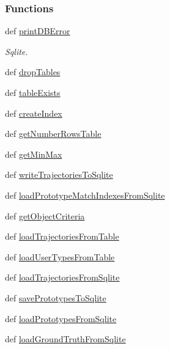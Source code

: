 \subsubsection*{Functions}
\begin{DoxyCompactItemize}
\item 
def \hyperlink{namespacestorage_a04a1c447c91782b0d795707de67ae7b6}{print\-D\-B\-Error}
\begin{DoxyCompactList}\small\item\em Sqlite. \end{DoxyCompactList}\item 
def \hyperlink{namespacestorage_a35c78cf3ce7e197ae90cc8de16a30421}{drop\-Tables}
\item 
def \hyperlink{namespacestorage_aa7fdbbe6654ec5ca55ad0fcf32163f4a}{table\-Exists}
\item 
def \hyperlink{namespacestorage_a850aebaeeaa2d26f74597b82745d5918}{create\-Index}
\item 
def \hyperlink{namespacestorage_acb15e4489aa98d2fd2e32b16bc117757}{get\-Number\-Rows\-Table}
\item 
def \hyperlink{namespacestorage_a96ea45568cc0df3ee1f2c57f0fe4ebaa}{get\-Min\-Max}
\item 
def \hyperlink{namespacestorage_a672b79a876d42080ef53d92a1954ad48}{write\-Trajectories\-To\-Sqlite}
\item 
def \hyperlink{namespacestorage_a4cb2ef5094e697c775c647fd8572ca71}{load\-Prototype\-Match\-Indexes\-From\-Sqlite}
\item 
def \hyperlink{namespacestorage_aabc95387a546365a13eedfaeb9c1cab4}{get\-Object\-Criteria}
\item 
def \hyperlink{namespacestorage_a8df1322946f05da107aae12c3f81ccb3}{load\-Trajectories\-From\-Table}
\item 
def \hyperlink{namespacestorage_ae293f43a618f7cc23940dcc3eae4b86a}{load\-User\-Types\-From\-Table}
\item 
def \hyperlink{namespacestorage_aaafba9f6bc0816ff0084df5e1d892a9d}{load\-Trajectories\-From\-Sqlite}
\item 
def \hyperlink{namespacestorage_a3841952587a89c7fa5beb809c85609e1}{save\-Prototypes\-To\-Sqlite}
\item 
def \hyperlink{namespacestorage_a6a91f0d2d8fa82627757c88e12610590}{load\-Prototypes\-From\-Sqlite}
\item 
def \hyperlink{namespacestorage_aa3adae129d45a66fe22312bd3db7b43c}{load\-Ground\-Truth\-From\-Sqlite}
\item 

\end{DoxyCompactItemize}

